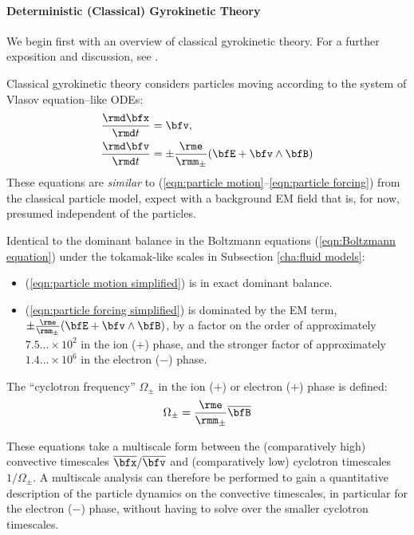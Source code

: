 \paragraph*{Deterministic (Classical) Gyrokinetic Theory}
    We begin first with an overview of classical gyrokinetic theory. For a further exposition and discussion, see \cite{Woods_2006, Freidberg_2008, Chen_2015}.

    Classical gyrokinetic theory considers particles moving according to the system of Vlasov equation--like ODEs:
    \begin{align}
        \frac{\rmd\bfx}{\rmd t}  &=  \bfv,  \label{eqn:particle motion simplified}  \\
        \frac{\rmd\bfv}{\rmd t}  &=  \pm\frac{\rme}{\rmm_{\pm}}(\bfE + \bfv\wedge\bfB)  \label{eqn:particle forcing simplified}
    \end{align}
    These equations are \emph{similar} to (\ref{eqn:particle motion}--\ref{eqn:particle forcing}) from the classical particle model, expect with a background EM field that is, for now, presumed independent of the particles.
    
    Identical to the dominant balance in the Boltzmann equations (\ref{eqn:Boltzmann equation}) under the tokamak-like scales in Subsection \ref{cha:fluid models}:
    \begin{itemize}
        \item  (\ref{eqn:particle motion simplified}) is in exact dominant balance.
        \item  (\ref{eqn:particle forcing simplified}) is dominated by the EM term, $\pm\frac{\rme}{\rmm_{\pm}}(\bfE + \bfv\wedge\bfB)$, by a factor on the order of approximately $7.5\ldots\times 10^{2}$ in the ion ($+$) phase, and the stronger factor of approximately $1.4\ldots\times 10^{6}$ in the electron ($-$) phase. 
    \end{itemize}

    \begin{definition}
        The ``cyclotron frequency'' $\Omega_{\pm}$ in the ion ($+$) or electron ($+$) phase is defined: 
        \begin{equation}
            \Omega_{\pm}  =  \frac{\rme}{\rmm_{\pm}}\overline{\bfB}
        \end{equation}
    \end{definition}
    
    These equations take a multiscale form between the (comparatively high) convective timescales $\overline{\bfx}/\overline{\bfv}$ and (comparatively low) cyclotron timescales $1/\Omega_{\pm}$. A multiscale analysis \cite{Kevorkin_Cole_2012} can therefore be performed to gain a quantitative description of the particle dynamics on the convective timescales, in particular for the electron ($-$) phase, without having to solve over the smaller cyclotron timescales.

